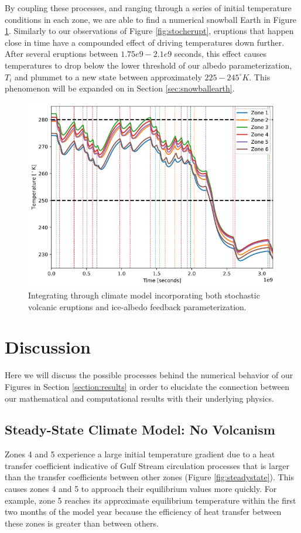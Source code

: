 \documentclass{article}
\begin{document}
By coupling these processes, and ranging through a series of initial temperature conditions in each zone, we are able to find a numerical snowball Earth in Figure \ref{fig:fireandice}. Similarly to our observations of Figure \ref{fig:stocherupt}, eruptions that happen close in time have a compounded effect of driving temperatures down further. After several eruptions between $1.75e9-2.1e9$ seconds, this effect causes temperatures to drop below the lower threshold of our albedo parameterization, $T_i$ and plummet to a new state between approximately $225-245^{\circ}K$. This phenomenon will be expanded on in Section \ref{sec:snowballearth}.

\begin{figure}[h]
    \centering
    \includegraphics[scale=0.4]{eruptandice.png}
    \caption{Integrating through climate model incorporating both stochastic volcanic eruptions and ice-albedo feedback parameterization.}
    \label{fig:fireandice}
\end{figure}
\FloatBarrier

\section{Discussion}
Here we will discuss the possible processes behind the numerical behavior of our Figures in Section \ref{section:results} in order to elucidate the connection between our mathematical and computational results with their underlying physics.

\subsection{Steady-State Climate Model: No Volcanism}
\label{section:steadystate}
Zones 4 and 5 experience a large initial temperature gradient due to a heat transfer coefficient indicative of Gulf Stream circulation processes that is larger than the transfer coefficients between other zones (Figure \ref{fig:steadystate}). This causes zones 4 and 5 to approach their equilibrium values more quickly. For example, zone 5 reaches its approximate equilibrium temperature within the first two months of the model year because the efficiency of heat transfer between these zones is greater than between others.
\end{document}
